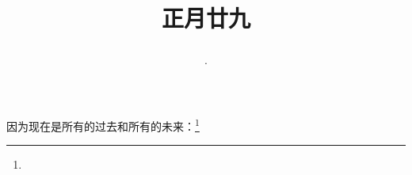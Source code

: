 \title{\date[d=9,m=3,y=2024][year:cn-y,年,month:cn,day:cn,日,·,weekday]·正月廿九 }
因为现在是所有的过去和所有的未来：\footnote{ }

